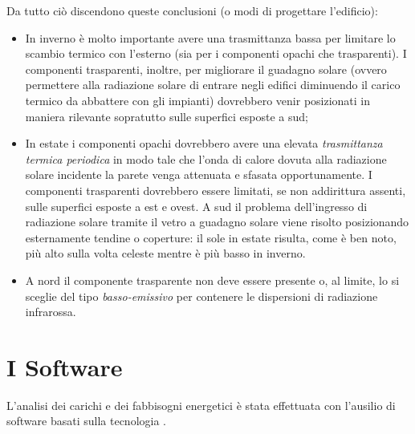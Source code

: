 Da tutto ciò discendono queste conclusioni (o modi di progettare l'edificio):
\begin{itemize}
	\item In inverno è molto importante avere una trasmittanza bassa per limitare lo scambio termico con l'esterno (sia per i componenti opachi che trasparenti). I componenti trasparenti, inoltre, per migliorare il guadagno solare (ovvero permettere alla radiazione solare di entrare negli edifici diminuendo il carico termico da abbattere con gli impianti) dovrebbero venir posizionati in maniera rilevante sopratutto sulle superfici esposte a sud;
	\item In estate i componenti opachi dovrebbero avere una elevata \emph{trasmittanza termica periodica} in modo tale che l'onda di calore dovuta alla radiazione solare incidente la parete venga attenuata e sfasata opportunamente. I componenti trasparenti dovrebbero essere limitati, se non addirittura assenti, sulle superfici esposte a est e ovest. A sud il problema dell'ingresso di radiazione solare tramite il vetro a guadagno solare viene risolto posizionando esternamente tendine o coperture: il sole in estate risulta, come è ben noto, più alto sulla volta celeste mentre è più basso in inverno. 
	\item A nord il componente trasparente non deve essere presente o, al limite, lo si sceglie del tipo \emph{basso-emissivo} per contenere le dispersioni di radiazione infrarossa. 
\end{itemize}
\section{I Software}
L'analisi dei carichi e dei fabbisogni energetici è stata effettuata con l'ausilio di software basati sulla tecnologia \bim.

